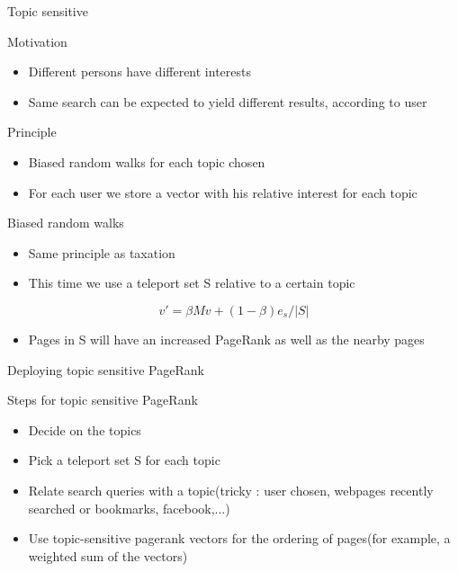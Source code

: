 \documentclass[10pt]{beamer}
\begin{document}
\begin{frame}[allowframebreaks]{Topic sensitive}
  \begin{block}{Motivation}
  \begin{itemize}
  \item Different persons have different interests
  \item Same search can be expected to yield different results, according to user
  \end{itemize}
  \end{block}
  \begin{block}{Principle}
  \begin{itemize}
  \item Biased random walks for each topic chosen
  \item For each user we store a vector with his relative interest for each topic
  \end{itemize}
  \end{block}
  \framebreak
  \begin{block}{Biased random walks}
    \begin{itemize}
      \item Same principle as taxation
      \item This time we use a teleport set S relative to a certain topic
    \end{itemize}
    $$ v' = \beta Mv + (1-\beta)e_s/|S|$$
    \begin{itemize}
    \item Pages in S will have an increased PageRank as well as the nearby pages
    \end{itemize}
  \end{block}
\end{frame}


\begin{frame}{Deploying topic sensitive PageRank}
  \begin{block}{Steps for topic sensitive PageRank}
    \begin{itemize}
      \item Decide on the topics
      \item Pick a teleport set S for each topic
      \item Relate search queries with a topic(tricky : user chosen, webpages recently searched or bookmarks, facebook,...)
      \item Use topic-sensitive pagerank vectors for the ordering of pages(for example, a weighted sum of the vectors)
    \end{itemize}
  \end{block}
\end{frame}
\end{document}
